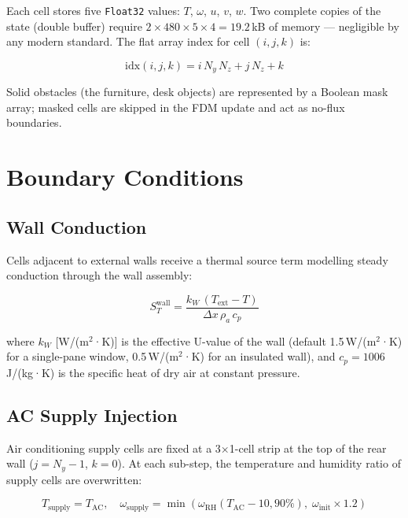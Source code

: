 \documentclass[12pt,a4paper]{report}
\begin{document}
Each cell stores five \texttt{Float32} values: $T$, $\omega$, $u$, $v$, $w$. Two complete copies of the state (double buffer) require $2 \times 480 \times 5 \times 4 = 19.2$\,kB of memory --- negligible by any modern standard. The flat array index for cell $(i,j,k)$ is:

\begin{equation}
  \text{idx}(i,j,k) = i\,N_y\,N_z + j\,N_z + k
  \label{eq:idx}
\end{equation}

Solid obstacles (the furniture, desk objects) are represented by a Boolean mask array; masked cells are skipped in the FDM update and act as no-flux boundaries.

\section{Boundary Conditions}
\label{sec:bc}

\subsection{Wall Conduction}
Cells adjacent to external walls receive a thermal source term modelling steady conduction through the wall assembly:

\begin{equation}
  S_T^\text{wall} = \frac{k_W\,(T_\text{ext} - T)}{\Delta x\,\rho_a\,c_p}
  \label{eq:wall_cond}
\end{equation}

where $k_W$ [W/(m$^2$·K)] is the effective U-value of the wall (default 1.5\,W/(m$^2$·K) for a single-pane window, 0.5\,W/(m$^2$·K) for an insulated wall), and $c_p = 1006$\,J/(kg·K) is the specific heat of dry air at constant pressure.

\subsection{AC Supply Injection}
Air conditioning supply cells are fixed at a 3×1-cell strip at the top of the rear wall ($j = N_y - 1$, $k = 0$). At each sub-step, the temperature and humidity ratio of supply cells are overwritten:

\begin{equation}
  T_\text{supply} = T_\text{AC}, \quad \omega_\text{supply} = \min\!\left(\omega_\text{RH}(T_\text{AC}-10, 90\%), \; \omega_\text{init} \times 1.2\right)
  \label{eq:ac}
\end{equation}
\end{document}
